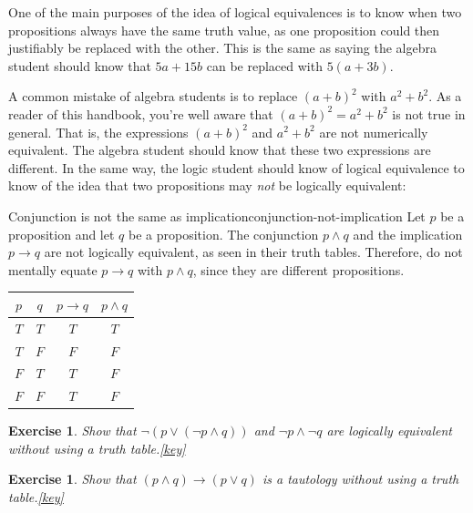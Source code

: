 \documentclass{book}
\newcounter{ekcounter}%
\theoremstyle{ekimcustom}
\newtheorem{exercise}[ekcounter]{Exercise}
\begin{document}
One of the main purposes of the idea of logical equivalences is to know when two propositions always have the same truth value, as one proposition could then justifiably be replaced with the other. This is the same as saying the algebra student should know that $5a+15b$ can be replaced with $5(a+3b)$.

A common mistake of algebra students is to replace $(a+b)^2$ with $a^2+b^2$. As a reader of this handbook, you're well aware that $(a+b)^2=a^2+b^2$ is not true in general. That is, the expressions $(a+b)^2$ and $a^2+b^2$ are not numerically equivalent. The algebra student should know that these two expressions are different. In the same way, the logic student should know of logical equivalence to know of the idea that two propositions may \emph{not} be logically equivalent:

\begin{bwarning}{Conjunction is not the same as implication}{conjunction-not-implication}
Let $p$ be a proposition and let $q$ be a proposition. The conjunction $p \wedge q$ and the implication $p \rightarrow q$ are not logically equivalent, as seen in their truth tables. Therefore, do not mentally equate $p \rightarrow q$ with $p \wedge q$, since they are different propositions.
\begin{center}
\begin{tabular}{c|c||c|c}
$p$ & $q$ & $p \rightarrow q$ & $p \wedge q$ \\\hline
$T$ & $T$ & $T$ & $T$\\
$T$ & $F$ & $F$ & $F$\\
$F$ & $T$ & $T$ & $F$\\
$F$ & $F$ & $T$ & $F$
\end{tabular}
\end{center}
\end{bwarning}

\begin{exercise}
Show that $\neg(p \vee (\neg p \wedge q))$ and $\neg p \wedge \neg q$ are logically equivalent without using a truth table.\quad\quad\href{https://www.sharelatex.com/project/59becb8fc3ef170ecbecf7ba}{{\color{red}[key]}}
\end{exercise}

\begin{exercise}
Show that $(p \wedge q) \rightarrow (p \vee q)$ is a tautology without using a truth table.\quad\quad\href{https://www.sharelatex.com/project/59becca4c3ef170ecbecf81e}{{\color{red}[key]}}
\end{exercise}
\end{document}
